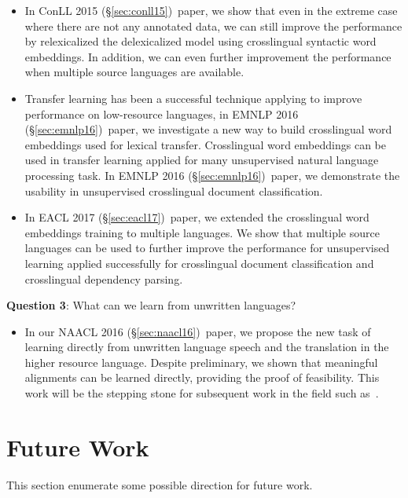 \documentclass[12pt,twoside,final,hidelinks]{ltthesis}
\theoremstyle{definition}
\newcommand\conllv{ConLL 2015 (\S\ref{sec:conll15})}
\newcommand\naaclvi{NAACL 2016 (\S\ref{sec:naacl16})}
\newcommand\emnlpvi{EMNLP 2016 (\S\ref{sec:emnlp16})}
\newcommand\eaclvii{EACL 2017 (\S\ref{sec:eacl17})}
\begin{document}
\begin{itemize}
\item In \conllv\ paper, we show that even in the extreme case where there are not any annotated data, we can still improve the performance by relexicalized the 
delexicalized model using crosslingual syntactic word embeddings. In addition, we can even further improvement the performance when multiple source languages are available.
\item Transfer learning has been a successful technique applying to improve performance on low-resource languages, in \emnlpvi\ paper, we investigate a new way to build crosslingual word embeddings used for lexical transfer. Crosslingual word embeddings can be used in transfer learning applied for many unsupervised natural 
language processing task. In \emnlpvi\ paper, we demonstrate the usability in unsupervised crosslingual document classification. 

\item In \eaclvii\ paper, we extended the crosslingual word embeddings training to multiple languages. We show that multiple source languages can be used to further improve the performance for unsupervised learning applied successfully for crosslingual document classification and crosslingual dependency parsing. 
\end{itemize}

\textbf{Question 3}: What can we learn from unwritten languages?
\begin{itemize}
\item In our \naaclvi\ paper, we propose the new task of learning directly from unwritten language speech and the translation in the higher resource language. Despite preliminary, we shown that meaningful alignments can be learned directly, providing the proof of feasibility. This work will be the stepping stone for 
subsequent work in the field such as~. 
\end{itemize}

\section{Future Work}
\label{sec:futurework}
This section enumerate some possible direction for future work. 
\end{document}

